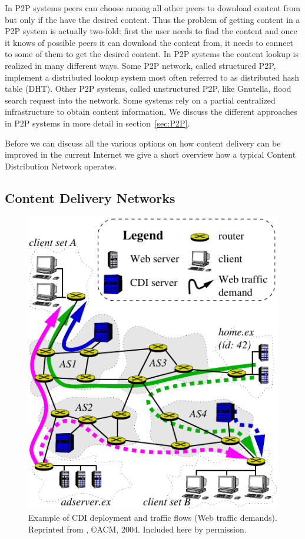 In P2P systems peers can choose among all other peers to download content from
but only if the have the desired content. Thus the problem of getting content
in a P2P system is actually two-fold: first the user needs to find the content
and once it knows of possible peers it can download the content from, it needs
to connect to some of them to get the desired content.  In P2P systems the
content lookup is realized in many different ways. Some P2P network, called
structured P2P, implement a distributed lookup system most often referred to as
distributed hash table (DHT). Other P2P systems, called unstructured P2P, like
Gnutella, flood search request into the network.  Some systems rely on a
partial centralized infrastructure to obtain content information. We discuss
the different approaches in P2P systems in more detail in
section~\ref{sec:P2P}.

Before we can discuss all the various options on how content delivery can be
improved in the current Internet we give a short overview how a typical Content
Distribution Network operates.


\subsection{Content Delivery Networks} \label{sec:content_delivery}

\begin{figure} \begin{center}
\includegraphics[width=0.7\linewidth]{figures-pdf/flows-example} 
\end{center}
\caption{Example of CDI deployment and traffic flows (Web traffic
  demands). Reprinted from \cite{inferring-web-demand}, \copyright ACM, 2004. Included here by permission.}
\label{fig:aka:cdn} \end{figure}

